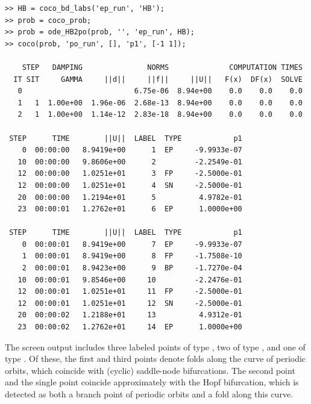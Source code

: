 \begin{lstlisting}[language=coco-highlight,frame=lines]
>> HB = coco_bd_labs('ep_run', 'HB');
>> prob = coco_prob;
>> prob = ode_HB2po(prob, '', 'ep_run', HB);
>> coco(prob, 'po_run', [], 'p1', [-1 1]);

    STEP   DAMPING               NORMS              COMPUTATION TIMES
  IT SIT     GAMMA     ||d||     ||f||     ||U||   F(x)  DF(x)  SOLVE
   0                          6.75e-06  8.94e+00    0.0    0.0    0.0
   1   1  1.00e+00  1.96e-06  2.68e-13  8.94e+00    0.0    0.0    0.0
   2   1  1.00e+00  1.14e-12  2.83e-18  8.94e+00    0.0    0.0    0.0

 STEP      TIME        ||U||  LABEL  TYPE            p1
    0  00:00:00   8.9419e+00      1  EP     -9.9933e-07
   10  00:00:00   9.8606e+00      2         -2.2549e-01
   12  00:00:00   1.0251e+01      3  FP     -2.5000e-01
   12  00:00:00   1.0251e+01      4  SN     -2.5000e-01
   20  00:00:00   1.2194e+01      5          4.9782e-01
   23  00:00:01   1.2762e+01      6  EP      1.0000e+00

 STEP      TIME        ||U||  LABEL  TYPE            p1
    0  00:00:01   8.9419e+00      7  EP     -9.9933e-07
    1  00:00:01   8.9419e+00      8  FP     -1.7508e-10
    2  00:00:01   8.9423e+00      9  BP     -1.7270e-04
   10  00:00:01   9.8546e+00     10         -2.2476e-01
   12  00:00:01   1.0251e+01     11  FP     -2.5000e-01
   12  00:00:01   1.0251e+01     12  SN     -2.5000e-01
   20  00:00:02   1.2188e+01     13          4.9312e-01
   23  00:00:02   1.2762e+01     14  EP      1.0000e+00
\end{lstlisting}
The screen output includes three labeled points of type , two of type , and one of type . Of these, the first and third  points denote folds along the curve of periodic orbits, which coincide with (cyclic) saddle-node bifurcations. The second  point and the single  point coincide approximately with the Hopf bifurcation, which is detected as both a branch point of periodic orbits and a fold along this curve.


